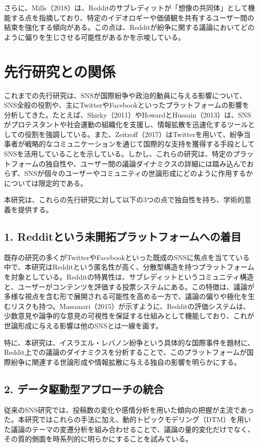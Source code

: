 \documentclass[11pt, a4j]{jreport}
\begin{document}
    さらに、Mills（2018）は、Redditのサブレディットが「想像の共同体」として機能する点を指摘しており、特定のイデオロギーや価値観を共有するユーザー間の結束を強化する傾向がある。この点は、Redditが紛争に関する議論においてどのように偏りを生じさせる可能性があるかを示唆している。

    \section{先行研究との関係}
    これまでの先行研究は、SNSが国際紛争や政治的動員に与える影響について、SNS全般の役割や、主にTwitterやFacebookといったプラットフォームの影響を分析してきた。たとえば、Shirky（2011）やHowardとHussain（2013）は、SNSがプロテスタントや社会運動の組織化を支援し、情報拡散を迅速化するツールとしての役割を強調している。また、Zeitzoff（2017）はTwitterを用いて、紛争当事者が戦略的なコミュニケーションを通じて国際的な支持を獲得する手段としてSNSを活用していることを示している。しかし、これらの研究は、特定のプラットフォームの独自性や、ユーザー間の議論ダイナミクスの詳細には踏み込んでおらず、SNSが個々のユーザーやコミュニティの世論形成にどのように作用するかについては限定的である。

    本研究は、これらの先行研究に対して以下の3つの点で独自性を持ち、学術的意義を提供する。

    \subsection*{1. Redditという未開拓プラットフォームへの着目}
    既存の研究の多くがTwitterやFacebookといった既成のSNSに焦点を当てている中で、本研究はRedditという匿名性が高く、分散型構造を持つプラットフォームを対象としている。Redditの特異性は、サブレディットというコミュニティ構造と、ユーザーがコンテンツを評価する投票システムにある。この特徴は、議論が多様な視点を含む形で展開される可能性を高める一方で、議論の偏りや極化を生むリスクも持つ。Massanari（2015）が示すように、Redditの評価システムは、少数意見や論争的な意見の可視性を保証する仕組みとして機能しており、これが世論形成に与える影響は他のSNSとは一線を画す。

    特に、本研究は、イスラエル・レバノン紛争という具体的な国際事件を題材に、Reddit上での議論のダイナミクスを分析することで、このプラットフォームが国際紛争に関連する世論形成や情報拡散に与える独自の影響を明らかにする。

    \subsection*{2. データ駆動型アプローチの統合}
    従来のSNS研究では、投稿数の変化や感情分析を用いた傾向の把握が主流であった。本研究ではこれらの手法に加え、動的トピックモデリング（DTM）を用いた議論のテーマの変遷分析を組み合わせることで、議論の量的変化だけでなく、その質的側面を時系列的に明らかにすることを試みている。
\end{document}
